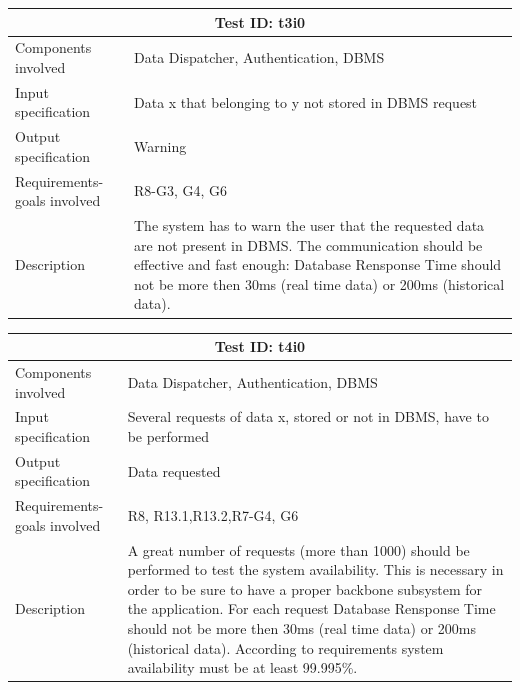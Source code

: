 \begin{table}[H]
\centering
\begin{tabular}{ |p{4.5cm}||p{11cm}|  }
 \hline
 \multicolumn{2}{|c|}{Test ID: t3i0} \\
 
 \hline 
Components involved  	& 	 Data Dispatcher, Authentication, DBMS\\
 Input specification  	& 	  Data x that belonging to y not stored in DBMS request\\
Output specification  	& 	 Warning\\
Requirements-goals involved & R8-G3, G4, G6 \\
Description  	& 	The system has to warn the user that the requested data are not present in DBMS. The communication should be effective and fast enough: Database Rensponse Time should not be more then 30ms (real time data) or 200ms (historical data).\\
 \hline
\end{tabular}
\end{table}
\begin{table}[H]
\centering
\begin{tabular}{ |p{4.5cm}||p{11cm}|  }
 \hline
 \multicolumn{2}{|c|}{Test ID: t4i0} \\
 
 \hline 
Components involved  	& 	 Data Dispatcher, Authentication, DBMS\\
 Input specification  	& 	Several requests of data x, stored or not in DBMS, have to be performed\\
Output specification  	& Data requested\\
Requirements-goals involved & R8, R13.1,R13.2,R7-G4, G6\\
Description  	& 	A great number of requests (more than 1000) should be performed to test the system availability. This is necessary in order to be sure to have a proper backbone subsystem for the application. For each request Database Rensponse Time should not be more then 30ms (real time data) or 200ms (historical data). According to requirements system availability must be at least 99.995\%.  	\\
 \hline
\end{tabular}
\end{table}


